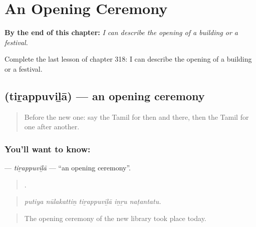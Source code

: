
\chapter{An Opening Ceremony}
\label{ch:ta-an-opening-ceremony}

\begin{chapteropening}
\textbf{By the end of this chapter:} \emph{I can describe the opening of a building or a festival.}

Complete the last lesson of chapter 318: I can describe the opening of a building or a festival.
\end{chapteropening}

\section[\texorpdfstring{\ta{திறப்புவிழா} (tiṟappuviḻā)}{திறப்புவிழா (tiṟappuviḻā)}]{ (tiṟappuviḻā) — an opening ceremony}

\label{lesson:TA-C318-tirappuvila}



\begin{quote}
Before the new one: say the Tamil for then and there, then the Tamil for one after another.
\end{quote}

\subsection*{You'll want to know: }
\textbf{} — \emph{tiṟappuviḻā} — \textquotedblleft{}an opening ceremony\textquotedblright{}.

\begin{quote}
    .
\end{quote}

\begin{quote}
\emph{putiya nūlakattiṉ tiṟappuviḻā iṉṟu naṭantatu.}
\end{quote}

\begin{quote}
The opening ceremony of the new library took place today.
\end{quote}

